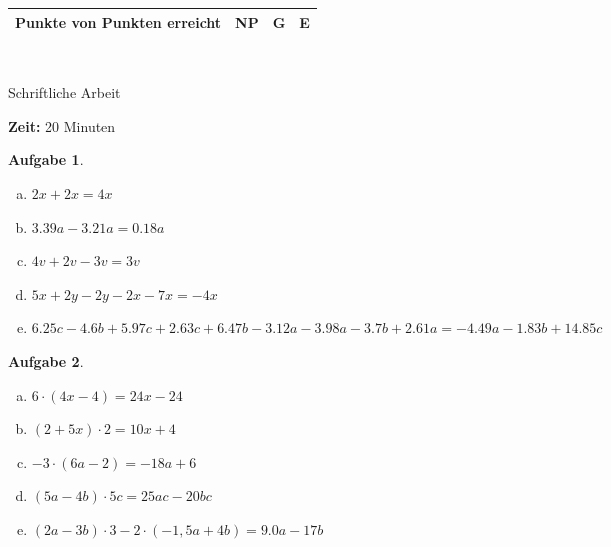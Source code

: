 \documentclass[12pt,fleqn]{article}
\theoremstyle{aufg}
\newtheorem{aufgabe}{Aufgabe}
\theoremstyle{bsp}
\begin{document}
 
    \begin{flushleft}
\renewcommand{\arraystretch}{2.15} 
\begin{tabular}{|p{10cm}|p{2cm}|p{2cm}|p{2cm}|} 
\hline 
\hspace{2cm} Punkte von \qquad20\qquad Punkten erreicht & \hspace{1.2cm} NP & G & E \\ 
\hline 
\end{tabular} \\[1em]    
\begin{center}{\Large Schriftliche Arbeit}\end{center} 
{\bf Zeit: }20 Minuten\\ 
\begin{aufgabe} ~ \\ 
\begin{enumerate}[a)] 
\item 
$2x+2x = 4 x$
\item 
$3.39a-3.21a = 0.18 a$
\item 
$4v+2v-3v = 3 v$
\item 
$5x+2y-2y-2x-7x = - 4 x$
\item 
$6.25c-4.6b+5.97c+2.63c+6.47b-3.12a-3.98a-3.7b+2.61a = - 4.49 a - 1.83 b + 14.85 c$
\end{enumerate} 
\end{aufgabe} 
\begin{aufgabe} ~ \\ 
\begin{enumerate}[a)] 
\item 
$6\cdot(4x-4) = 24 x - 24$
\item 
$(2+5x)\cdot2 = 10 x + 4$
\item 
$-3\cdot(6a-2) = - 18 a + 6$
\item 
$(5a-4b)\cdot5c = 25 a c - 20 b c$
\item 
$(2a-3b)\cdot 3-2\cdot (-1,5a+4b) = 9.0 a - 17 b$
\end{enumerate} 
\end{aufgabe} 
\end{flushleft} 
    
\end{document}
